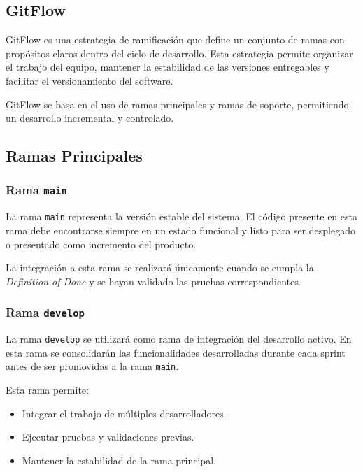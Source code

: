 \documentclass[12pt]{article}
\begin{document}
\subsection{GitFlow}

GitFlow es una estrategia de ramificación que define un conjunto de ramas con propósitos claros dentro del ciclo de desarrollo. Esta estrategia permite organizar el trabajo del equipo, mantener la estabilidad de las versiones entregables y facilitar el versionamiento del software.

GitFlow se basa en el uso de ramas principales y ramas de soporte, permitiendo un desarrollo incremental y controlado.

\subsection{Ramas Principales}

\subsubsection{Rama \texttt{main}}

La rama \texttt{main} representa la versión estable del sistema. El código presente en esta rama debe encontrarse siempre en un estado funcional y listo para ser desplegado o presentado como incremento del producto.

La integración a esta rama se realizará únicamente cuando se cumpla la \textit{Definition of Done} y se hayan validado las pruebas correspondientes.

\subsubsection{Rama \texttt{develop}}

La rama \texttt{develop} se utilizará como rama de integración del desarrollo activo. En esta rama se consolidarán las funcionalidades desarrolladas durante cada sprint antes de ser promovidas a la rama \texttt{main}.

Esta rama permite:
\begin{itemize}
    \item Integrar el trabajo de múltiples desarrolladores.
    \item Ejecutar pruebas y validaciones previas.
    \item Mantener la estabilidad de la rama principal.
\end{itemize}
\end{document}
